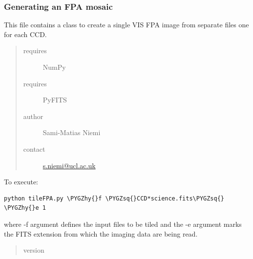 \documentclass[a4paper,11pt,english]{sphinxmanual}
\def\PYGZhy{\char`\-}
\def\PYGZsq{\char`\'}
\renewcommand\PYGZsq{\textquotesingle}
\begin{document}
\subsubsection{Generating an FPA mosaic}
\label{postproc:generating-an-fpa-mosaic}
This file contains a class to create a single VIS FPA image from separate files one for each CCD.
\begin{quote}\begin{description}
\item[{requires}] \leavevmode
NumPy

\item[{requires}] \leavevmode
PyFITS

\item[{author}] \leavevmode
Sami-Matias Niemi

\item[{contact}] \leavevmode
\href{mailto:s.niemi@ucl.ac.uk}{s.niemi@ucl.ac.uk}

\end{description}\end{quote}

To execute:

\begin{Verbatim}[commandchars=\\\{\}]
python tileFPA.py \PYGZhy{}f \PYGZsq{}CCD*science.fits\PYGZsq{} \PYGZhy{}e 1
\end{Verbatim}

where -f argument defines the input files to be tiled and the -e argument marks the
FITS extension from which the imaging data are being read.
\begin{quote}\begin{description}
\item[{version}] 

\end{description}\end{quote}
\end{document}

